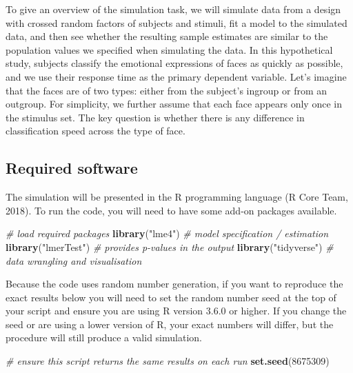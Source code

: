 \documentclass[
  english,
  doc,floatsintext]{apa6}
\newenvironment{Shaded}{\begin{snugshade}}{\end{snugshade}}
\newcommand{\CommentTok}[1]{\textcolor[rgb]{0.56,0.35,0.01}{\textit{#1}}}
\newcommand{\DecValTok}[1]{\textcolor[rgb]{0.00,0.00,0.81}{#1}}
\newcommand{\KeywordTok}[1]{\textcolor[rgb]{0.13,0.29,0.53}{\textbf{#1}}}
\newcommand{\NormalTok}[1]{#1}
\newcommand{\StringTok}[1]{\textcolor[rgb]{0.31,0.60,0.02}{#1}}
\begin{document}
To give an overview of the simulation task, we will simulate data from a design with crossed random factors of subjects and stimuli, fit a model to the simulated data, and then see whether the resulting sample estimates are similar to the population values we specified when simulating the data. In this hypothetical study, subjects classify the emotional expressions of faces as quickly as possible, and we use their response time as the primary dependent variable. Let's imagine that the faces are of two types: either from the subject's ingroup or from an outgroup. For simplicity, we further assume that each face appears only once in the stimulus set. The key question is whether there is any difference in classification speed across the type of face.

\hypertarget{required-software}{%
\subsection{Required software}\label{required-software}}

The simulation will be presented in the R programming language (R Core Team, 2018). To run the code, you will need to have some add-on packages available.

\begin{Shaded}
\begin{Highlighting}[]
\CommentTok{# load required packages}
\KeywordTok{library}\NormalTok{(}\StringTok{"lme4"}\NormalTok{)        }\CommentTok{# model specification / estimation}
\KeywordTok{library}\NormalTok{(}\StringTok{"lmerTest"}\NormalTok{)    }\CommentTok{# provides p-values in the output}
\KeywordTok{library}\NormalTok{(}\StringTok{"tidyverse"}\NormalTok{)   }\CommentTok{# data wrangling and visualisation}
\end{Highlighting}
\end{Shaded}

Because the code uses random number generation, if you want to reproduce the exact results below you will need to set the random number seed at the top of your script and ensure you are using R version 3.6.0 or higher. If you change the seed or are using a lower version of R, your exact numbers will differ, but the procedure will still produce a valid simulation.

\begin{Shaded}
\begin{Highlighting}[]
\CommentTok{# ensure this script returns the same results on each run}
\KeywordTok{set.seed}\NormalTok{(}\DecValTok{8675309}\NormalTok{)}
\end{Highlighting}
\end{Shaded}
\end{document}
